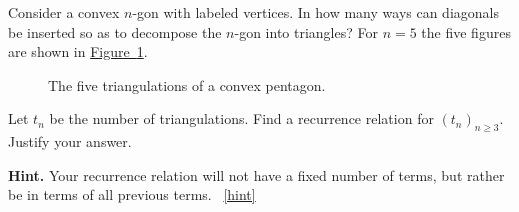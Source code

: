 \documentclass{book}
\begin{document}
\setcounter{project}{141}
\addtocounter{project}{-1}
\begin{activity}[]\label{act-catalanfirst}
\hypertarget{p-941}{}%
Consider a convex \(n\)-gon with labeled vertices.  In how many ways can diagonals be inserted so as to decompose the \(n\)-gon into triangles? For \(n = 5\) the five figures are shown in \hyperref[five5gons]{Figure~\ref{five5gons}}.%
\begin{figure}
\centering
\begin{sidebyside}{5}{0}{0}{0}
\begin{sbspanel}{0.2}
\end{sbspanel}
\begin{sbspanel}{0.2}
\end{sbspanel}
\begin{sbspanel}{0.2}
\end{sbspanel}
\begin{sbspanel}{0.2}
\end{sbspanel}
\begin{sbspanel}{0.2}
\end{sbspanel}
\end{sidebyside}
\caption{The five triangulations of a convex pentagon.\label{five5gons}}
\end{figure}
\hypertarget{p-942}{}%
Let \(t_n\) be the number of triangulations.  Find a recurrence relation for \((t_n)_{n \ge 3}\).  Justify your answer.%
\par\smallskip%
\noindent\textbf{Hint.}\hypertarget{hint-100}{}\quad%
\hypertarget{p-943}{}%
Your recurrence relation will not have a fixed number of terms, but rather be in terms of all previous terms.%
~\hfill{\tiny\hyperlink{a-141}{[hint]}\hypertarget{q-141}{}}\end{activity}
\end{document}
